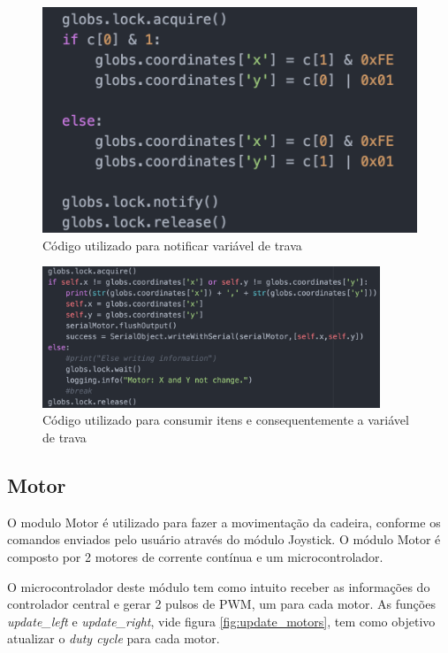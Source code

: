   \begin{figure}[!htb]
  \centering
  \includegraphics[keepaspectratio=true,scale=0.5]{figuras/resultados/joy_lock}
  \caption{Código utilizado para notificar variável de trava}
  \label{fig:joy_lock}
  \end{figure}

  \begin{figure}[!htb]
  \centering
  \includegraphics[width=0.9\textwidth]{figuras/resultados/motor_lock}
  \caption{Código utilizado para consumir itens e consequentemente a variável de trava}
  \label{fig:motor_lock}
  \end{figure}

\subsection{Motor}

    O modulo Motor é utilizado para fazer a movimentação da cadeira, conforme os comandos enviados pelo usuário através do módulo Joystick. O módulo Motor é composto por 2 motores de corrente contínua e um microcontrolador.

    O microcontrolador deste módulo tem como intuito receber as informações do controlador central e gerar 2 pulsos de PWM, um para cada motor. As funções \textit{update\_left} e \textit{update\_right}, vide figura \ref{fig:update_motors}, tem como objetivo atualizar o \textit{duty cycle} para cada motor.

